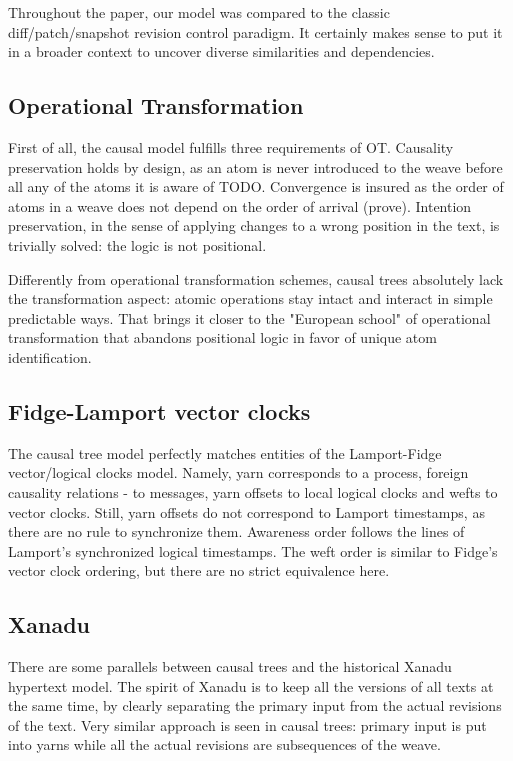 \documentclass{acm_proc_article-sp}
\begin{document}
Throughout the paper, our model was compared to the classic
diff/patch/snapshot revision control paradigm. It certainly makes
sense to put it in a broader context to uncover diverse
similarities and dependencies.

\subsection{Operational Transformation}

First of all, the causal model fulfills three requirements of OT.
Causality preservation holds
by design, as an atom is never introduced to the weave before all
any of the atoms it is aware of TODO.
Convergence is insured as the order of atoms in a weave does
not depend on the order of arrival (prove). Intention
preservation, in the sense of applying changes to a wrong position
in the text, is trivially solved: the logic is not positional.

Differently from operational transformation schemes, causal trees
absolutely lack the transformation aspect: atomic operations
stay intact and interact in simple predictable ways. That brings
it closer to the "European school" of operational transformation
that abandons positional logic in favor of unique atom
identification.

\subsection{Fidge-Lamport vector clocks} \label{sec:lamport}

The causal tree model perfectly matches entities of the
Lamport-Fidge vector/logical clocks model. Namely, yarn
corresponds to a process, foreign causality relations - to
messages, yarn offsets to local logical clocks and wefts to
vector clocks. Still, yarn offsets do not correspond to Lamport
timestamps, as there are no rule to synchronize them.
Awareness order follows the lines of Lamport's synchronized
logical timestamps. The weft order is similar to Fidge's vector
clock ordering, but there are no strict equivalence here.

\subsection{Xanadu}

There are some parallels between causal trees and the historical
Xanadu hypertext model. The spirit of Xanadu is to keep all the
versions of all texts at the same time, by clearly separating the
primary input from the actual revisions of the text. Very similar 
approach is seen in causal trees: primary input is put into yarns
while all the actual revisions are subsequences of the weave.
\end{document}
